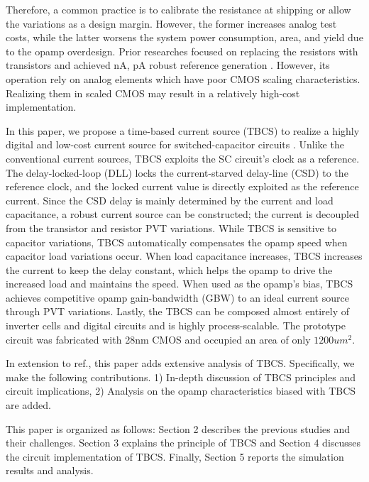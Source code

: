 \documentclass[paper]{ieice}
\begin{document}
Therefore, a common practice is to calibrate the resistance at shipping or allow the variations as a design margin. However, the former increases analog test costs, while the latter worsens the system power consumption, area, and yield due to the opamp overdesign. Prior researches focused on replacing the resistors with transistors and achieved nA, pA robust reference generation \cite{hirose2010nano, hirose2010cmos, osaki20131, choi201423pw}. However, its operation rely on analog elements which have poor CMOS scaling characteristics. Realizing them in scaled CMOS may result in a relatively high-cost implementation.

In this paper, we propose a time-based current source (TBCS) to realize a highly digital and low-cost current source for switched-capacitor circuits \cite{yoshioka201728}. Unlike the conventional current sources, TBCS exploits the SC circuit's clock as a reference. The delay-locked-loop (DLL) locks the current-starved delay-line (CSD) to the reference clock, and the locked current value is directly exploited as the reference current. 
Since the CSD delay is mainly determined by the current and load capacitance, a robust current source can be constructed; the current is decoupled from the transistor and resistor PVT variations.
While TBCS is sensitive to capacitor variations, TBCS automatically compensates the opamp speed when capacitor load variations occur. 
When load capacitance increases, TBCS increases the current to keep the delay constant, which helps the opamp to drive the increased load and maintains the speed. When used as the opamp's bias, TBCS achieves competitive opamp gain-bandwidth (GBW) to an ideal current source through PVT variations.
Lastly, the TBCS can be composed almost entirely of inverter cells and digital circuits and is highly process-scalable. The prototype circuit was fabricated with 28nm CMOS and occupied an area of only $1200um^2$.

In extension to ref.\cite{yoshioka201728, yoshioka2019digital}, this paper adds extensive analysis of TBCS. Specifically, we make the following contributions. 1) In-depth discussion of TBCS principles and circuit implications, 2) Analysis on the opamp characteristics biased with TBCS are added.

This paper is organized as follows: Section 2 describes the previous studies and their challenges. Section 3 explains the principle of TBCS and Section 4 discusses the circuit implementation of TBCS. Finally, Section 5 reports the simulation results and analysis.
\end{document}
